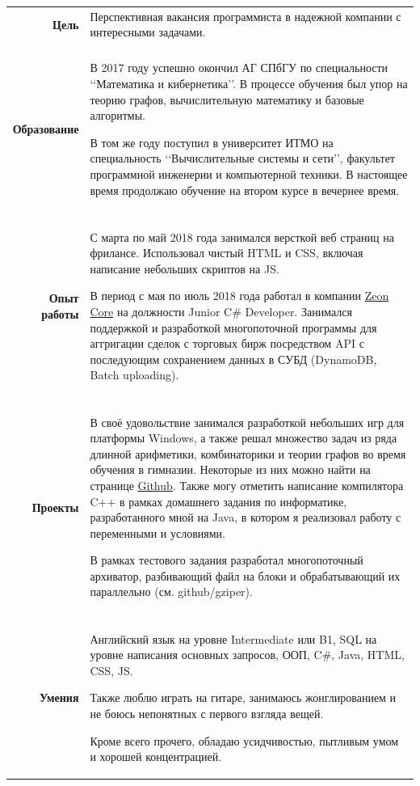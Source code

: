\documentclass[12pt]{article}
\begin{document}
\begin{tabularx}{\textwidth}{rX}
\textbf{Цель} &Перспективная вакансия программиста в надежной компании с интересными задачами.\\
&\\
\textbf{Образование} &
В 2017 году успешно окончил АГ СПбГУ по специальности \lq\lq{}Математика и кибернетика\rq\rq{}. В процессе обучения был упор на теорию графов, вычислительную математику и базовые алгоритмы. 

В том же году поступил в университет ИТМО на специальность \lq\lq{}Вычислительные системы и сети\rq\rq{}, факультет программной инженерии и компьютерной техники. В настоящее время продолжаю обучение на втором курсе в вечернее время. \\
&\\
\textbf{Опыт работы} & 
С марта по май 2018 года занимался версткой веб страниц на фрилансе. Использовал чистый HTML и CSS, включая написание небольших скриптов на JS.

В период с мая по июль 2018 года работал в компании \href{https://zeon.io}{Zeon Core} на должности Junior C\# Developer. Занимался поддержкой и разработкой многопоточной программы для аггригации сделок с торговых бирж посредством API с последующим сохранением данных в СУБД (DynamoDB, Batch uploading).\\
&\\
\textbf{Проекты}& 

В своё удовольствие занимался разработкой небольших игр для платформы Windows, а также решал множество задач из ряда длинной арифметики, комбинаторики и теории графов во время обучения в гимназии. Некоторые из них можно найти на странице \href{https://github.com/yohimik}{Github}. Также могу отметить написание компилятора C++ в рамках домашнего задания по информатике, разработанного мной на Java, в котором я реализовал работу с переменными и условиями.

В рамках тестового задания разработал многопоточный архиватор, разбивающий файл на блоки и обрабатывающий их параллельно (см. github/gziper).  \\
&\\
\textbf{Умения}& 

Английский язык на уровне Intermediate или B1, SQL на уровне написания основных запросов, ООП, C\#, Java, HTML, CSS, JS.

Также люблю играть на гитаре, занимаюсь жонглированием и не боюсь непонятных с первого взгляда вещей.

Кроме всего прочего, обладаю усидчивостью, пытливым умом и хорошей концентрацией.
\end{tabularx}
\end{document}
